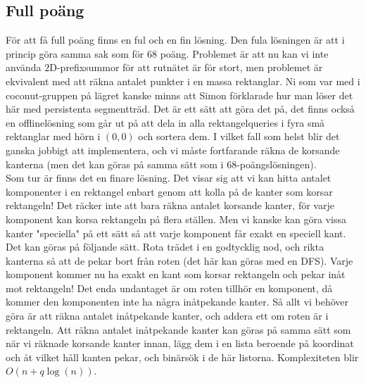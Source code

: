 \documentclass{article}
\begin{document}
\subsection*{Full poäng}
För att få full poäng finns en ful och en fin lösning. Den fula lösningen är att i princip göra samma sak som för $68$ poäng. Problemet är att nu kan vi inte använda $2$D-prefixsummor för att rutnätet är för stort, men problemet är ekvivalent med att räkna antalet punkter i en massa rektanglar. Ni som var med i coconut-gruppen på lägret kanske minns att Simon förklarade hur man löser det här med persistenta segmentträd. Det är ett sätt att göra det på, det finns också en offlinelösning som går ut på att dela in alla rektangelqueries i fyra små rektanglar med hörn i $(0,0)$ och sortera dem. I vilket fall som helst blir det ganska jobbigt att implementera, och vi måste fortfarande räkna de korsande kanterna (men det kan göras på samma sätt som i $68$-poängslösningen).\\

Som tur är finns det en finare lösning. Det visar sig att vi kan hitta antalet komponenter i en rektangel enbart genom att kolla på de kanter som korsar rektangeln! Det räcker inte att bara räkna antalet korsande kanter, för varje komponent kan korsa rektangeln på flera ställen. Men vi kanske kan göra vissa kanter "speciella" på ett sätt så att varje komponent får exakt en speciell kant. Det kan göras på följande sätt. Rota trädet i en godtycklig nod, och rikta kanterna så att de pekar bort från roten (det här kan göras med en DFS). Varje komponent kommer nu ha exakt en kant som korsar rektangeln och pekar inåt mot rektangeln! Det enda undantaget är om roten tillhör en komponent, då kommer den komponenten inte ha några inåtpekande kanter. Så allt vi behöver göra är att räkna antalet inåtpekande kanter, och addera ett om roten är i rektangeln. Att räkna antalet inåtpekande kanter kan göras på samma sätt som när vi räknade korsande kanter innan, lägg dem i en lista beroende på koordinat och åt vilket håll kanten pekar, och binärsök i de här listorna. Komplexiteten blir $O(n + q\log(n))$.
\end{document}
